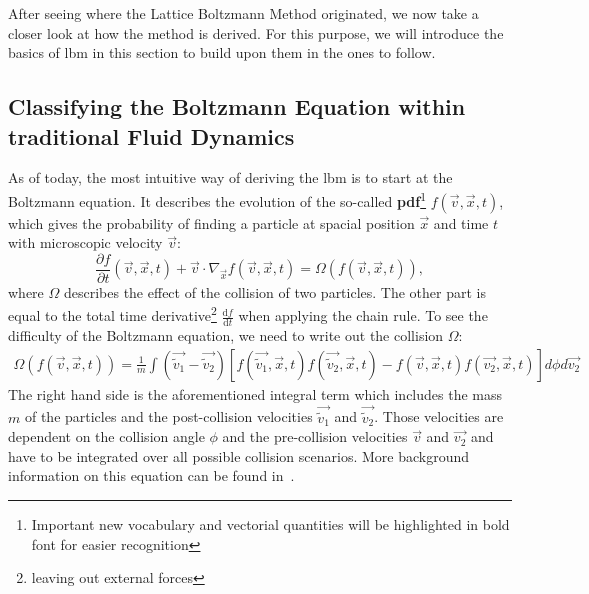 After seeing where the Lattice Boltzmann Method originated, we now take a closer look at how the method is derived.
For this purpose, we will introduce the basics of \gls{lbm} in this section to build upon them in the ones to follow.

\subsection{Classifying the Boltzmann Equation within traditional \newline Fluid Dynamics}
\label{sub:Classifying the Boltzmann Equation within traditional Fluid Dynamics}

As of today, the most intuitive way of deriving the \gls{lbm} is to start at the Boltzmann equation.
It describes the evolution of the so-called \textbf{\gls{pdf}}\footnote{Important new vocabulary and vectorial quantities will be highlighted in bold font for easier recognition} $f(\vec{v},\vec{x},t)$, which gives the probability of finding a particle at spacial position $\vec{x}$ and time $t$ with microscopic velocity $\vec{v}$:
\begin{equation}
  \label{eq: Boltzmann transport equation}
  \frac{\partial f}{\partial t} (\vec{v},\vec{x},t) + \vec{v} \cdot \nabla_{\vec{x}} f(\vec{v},\vec{x},t) = \Omega\left(f(\vec{v},\vec{x},t)\right),
\end{equation}
where $\Omega$ describes the effect of the collision of two particles. The other part is equal to the total time derivative\footnote{leaving out external forces} $\frac{\text{d}f}{\text{d}t}$ when applying the chain rule.
To see the difficulty of the Boltzmann equation, we need to write out the collision $\Omega$:
\begin{equation}
  \label{eq: Collision of boltzmann equation}
  \begin{aligned}
 \Omega\left(f(\vec{v},\vec{x},t)\right) =\frac{1}{m}
  \int \left( \vec{\tilde{v}_1}-\vec{\tilde{v}_2}\right)
  \left[
    f(\vec{\tilde{v}_1},\vec{x},t)f(\vec{\tilde{v}_2},\vec{x},t)
    -f(\vec{v},\vec{x},t)f(\vec{v_2},\vec{x},t)
  \right] d\phi d\vec{v_2}
\end{aligned}
\end{equation}
The right hand side is the aforementioned integral term which includes the mass $m$ of the particles and the post-collision velocities $\vec{\tilde{v}_1}$ and $\vec{\tilde{v}_2}$.
Those velocities are dependent on the collision angle $\phi$ and the pre-collision velocities $\vec{v}$ and $\vec{v_2}$ and have to be integrated over all possible collision scenarios.
More background information on this equation can be found in~\cite{harris2004introduction}.

